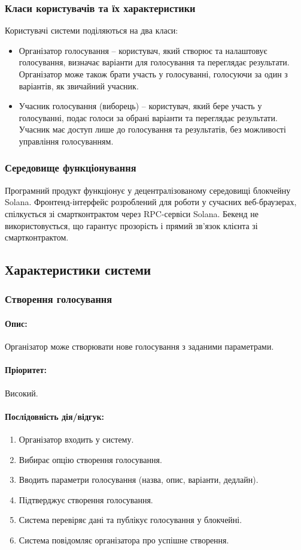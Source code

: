 \documentclass[14pt]{extreport}
\begin{document}
  \subsubsection{Класи користувачів та їх характеристики}
  Користувачі системи поділяються на два класи:
  \begin{itemize}
    \item Організатор голосування – користувач, який створює та налаштовує голосування, визначає варіанти для голосування та переглядає результати. Організатор може також брати участь у голосуванні, голосуючи за один з варіантів, як звичайний учасник.
    \item Учасник голосування (виборець) – користувач, який бере участь у голосуванні, подає голоси за обрані варіанти та переглядає результати. Учасник має доступ лише до голосування та результатів, без можливості управління голосуванням.
  \end{itemize}
  
  \subsubsection{Середовище функціонування}
  Програмний продукт функціонує у децентралізованому середовищі блокчейну Solana. Фронтенд-інтерфейс розроблений для роботи у сучасних веб-браузерах, спілкується зі смартконтрактом через RPC-сервіси Solana. Бекенд не використовується, що гарантує прозорість і прямий зв’язок клієнта зі смартконтрактом.

  \subsection{Характеристики системи}
  \subsubsection{Створення голосування}  
  \paragraph{Опис:} Організатор може створювати нове голосування з заданими параметрами.  
  \paragraph{Пріоритет:} Високий.  
  \paragraph{Послідовність дія/відгук:}  
  \begin{enumerate}  
      \item Організатор входить у систему.  
      \item Вибирає опцію створення голосування.  
      \item Вводить параметри голосування (назва, опис, варіанти, дедлайн).  
      \item Підтверджує створення голосування.  
      \item Система перевіряє дані та публікує голосування у блокчейні.  
      \item Система повідомляє організатора про успішне створення.  
  \end{enumerate}  
\end{document}
